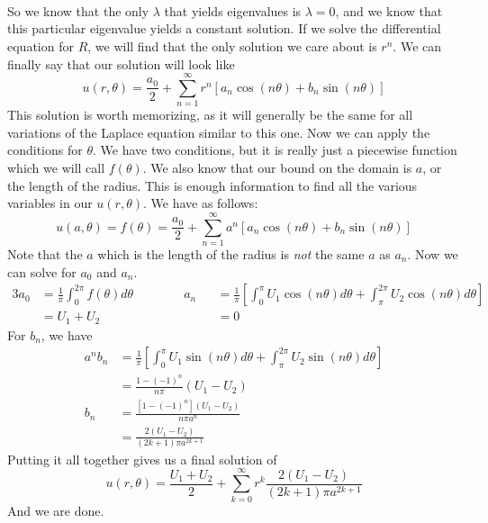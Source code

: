 \noindent\\\\\\
\noindent So we know that the only $\lambda$ that yields eigenvalues is $\lambda = 0$, and we know that this particular eigenvalue yields a constant solution. If we solve the differential equation for $R$, we will find that the only solution we care about is $r^{n}$. We can finally say that our solution will look like
\[
u(r,\theta) = \frac{a_{0}}{2} + \sum_{n=1}^{\infty}r^{n}[a_{n}\cos{(n\theta)} + b_{n}\sin{(n\theta)}]
\]
This solution is worth memorizing, as it will generally be the same for all variations of the Laplace equation similar to this one. Now we can apply the conditions for $\theta$. We have two conditions, but it is really just a piecewise function which we will call $f(\theta)$. We also know that our bound on the domain is $a$, or the length of the radius. This is enough information to find all the various variables in our $u(r,\theta)$. We have as follows:
\[
u(a,\theta) = f(\theta) = \frac{a_{0}}{2} + \sum_{n=1}^{\infty}a^{n}[a_{n}\cos{(n\theta)} + b_{n}\sin{(n\theta)}]
\]
Note that the $a$ which is the length of the radius is \textit{not} the same $a$ as $a_{n}$. Now we can solve for $a_{0}$ and $a_{n}$.
\begin{alignat*}{3}
a_{0} &= \frac{1}{\pi}\int_{0}^{2\pi}f(\theta)d\theta \qquad\qquad a_{n} &&= \frac{1}{\pi}\left[\int_{0}^{\pi}U_{1}\cos{(n\theta)}d\theta + \int_{\pi}^{2\pi}U_{2}\cos{(n\theta)}d\theta\right]\\
&= U_{1} + U_{2} &&=0
\end{alignat*}
For $b_{n}$, we have
\begin{align*}
a^{n}b_{n} &= \frac{1}{\pi}\left[\int_{0}^{\pi}U_{1}\sin{(n\theta)}d\theta + \int_{\pi}^{2\pi}U_{2}\sin{(n\theta)}d\theta\right]\\
&= \frac{1 - (-1)^{n}}{n\pi}(U_{1} - U_{2})\\
b_{n} &= \frac{\left[1 - (-1)^{n}\right](U_{1} - U_{2})}{n\pi a^{n}}\\
&= \frac{2(U_{1} - U_{2})}{(2k+1)\pi a^{2k+1}}
\end{align*}
Putting it all together gives us a final solution of
\[
u(r,\theta) = \frac{U_{1} + U_{2}}{2} + \sum_{k=0}^{\infty}r^{k}\frac{2(U_{1} - U_{2})}{(2k+1)\pi a^{2k+1}}
\]
And we are done.
\newpage


